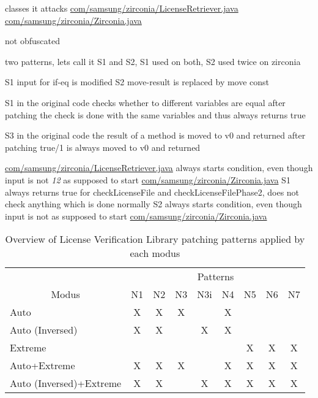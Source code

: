 classes it attacks %
\url{com/samsung/zirconia/LicenseRetriever.java}
\url{com/samsung/zirconia/Zirconia.java}

not obfuscated

two patterns, lets call it S1 and S2, S1 used on both, S2 used twice on zirconia



S1
input for if-eq is modified
S2
move-result is replaced by move const


S1
in the original code checks whether to different variables are equal
after patching the check is done with the same variables and thus always returns true

S3
in the original code the result of a method is moved to v0 and returned
after patching true/1 is always moved to v0 and returned



\url{com/samsung/zirconia/LicenseRetriever.java}
always starts condition, even though input is not \textit{12} as supposed to start
\url{com/samsung/zirconia/Zirconia.java}
S1
always returns true for checkLicenseFile and checkLicenseFilePhase2, does not check anything which is done normally
S2
always starts condition, even though input is not as supposed to start
\url{com/samsung/zirconia/Zirconia.java}
\begin{table}[h]
\centering
\begin{tabular}{l|cccccccc}
                           & \multicolumn{8}{c}{Patterns}           \\
\multicolumn{1}{c|}{Modus} & N1 & N2 & N3 & N3i & N4 & N5 & N6 & N7 \\ \hline
Auto                       & X  & X  & X  &     & X  &    &    &    \\
Auto (Inversed)            & X  & X  &    & X   & X  &    &    &    \\
Extreme                    &    &    &    &     &    & X  & X  & X  \\
Auto+Extreme               & X  & X  & X  &     & X  & X  & X  & X  \\
Auto (Inversed)+Extreme    & X  & X  &    & X   & X  & X  & X  & X
\end{tabular}
\caption{Overview of License Verification Library patching patterns applied by each modus}
\label{table:patterns}
\end{table}



